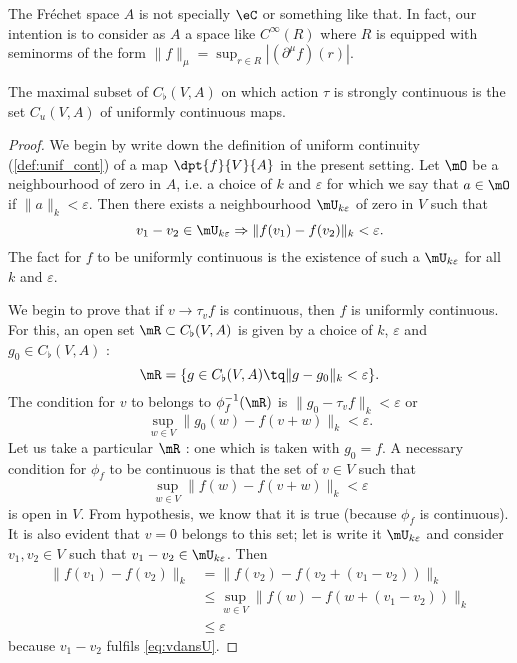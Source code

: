 \begin{remark}
The Fréchet space $A$ is not specially $\eC$ or something like that. In fact, our intention is to consider as $A$ a space like $ C^{\infty}(R)$ where $R$ is equipped with seminorms of the form $\| f \|_{\mu}=\sup_{r\in R}| (\partial^{\mu}f)(r) |$.
\end{remark}

\begin{proposition}
The maximal subset of $C_{\flat}(V,A)$ on which action $\tau$ is strongly continuous is the set $C_u(V,A)$ of uniformly continuous maps.
\end{proposition}

\begin{proof}
We begin by write down the definition of uniform continuity (\ref{def:unif_cont}) of a map $\dpt{f}{V}{A}$ in the present setting. Let $\mO$ be a neighbourhood of zero in $A$, i.e. a choice of $k$ and $\varepsilon$ for which we say that $a\in\mO$ if $\| a \|_k<\varepsilon$. Then there exists a neighbourhood $\mU_{k\varepsilon}$ of zero in $V$ such that 
\begin{equation}
v_1-v_2\in\mU_{k\varepsilon}\Rightarrow \| f(v_1)-f(v_2) \|_k<\varepsilon.
\end{equation}
The fact for $f$ to be uniformly continuous is the existence of such a $\mU_{k\varepsilon}$ for all $k$ and $\varepsilon$. 

We begin to prove that if $v\to\tau_vf$ is continuous, then $f$ is uniformly continuous.  For this, an open set $\mR\subset C_{\flat}(V,A)$ is given by a choice of $k$, $\varepsilon$ and $g_0\in C_{\flat}(V,A)$ :
\begin{equation}
   \mR=\{ g\in C_{\flat}(V,A)\tq \| g-g_0 \|_k< \varepsilon  \}.
\end{equation}
The condition for $v$ to belongs to $\phi_f^{-1}(\mR)$ is $\| g_0-\tau_vf \|_k<\varepsilon$ or
\begin{equation}
  \sup_{w\in V}\| g_0(w)-f(v+w) \|_k<\varepsilon.
\end{equation}
Let us take a particular $\mR$ : one which is taken with $g_0=f$. A necessary condition for $\phi_f$ to be continuous is that the set of $v\in V$ such that
\begin{equation} \label{eq:vdansU}
  \sup_{w\in V}\| f(w)-f(v+w) \|_k<\varepsilon
\end{equation}
is open in $V$. From hypothesis, we know that it is true (because $\phi_f$ is continuous). It is also evident that $v=0$ belongs to this set; let is write it $\mU_{k\varepsilon}$ and consider $v_1,v_2\in V$ such that $v_1-v_2\in\mU_{k\varepsilon}$. Then
\begin{equation}
\begin{split}
  \| f(v_1)-f(v_2) \|_k&=\| f(v_2)-f(v_2+(v_1-v_2)) \|_k\\
                       &\leq \sup_{w\in V}\| f(w)-f(w+(v_1-v_2)) \|_k\\
                       &\leq \varepsilon
\end{split}
\end{equation}
because $v_1-v_2$ fulfils \eqref{eq:vdansU}.


\end{proof}
